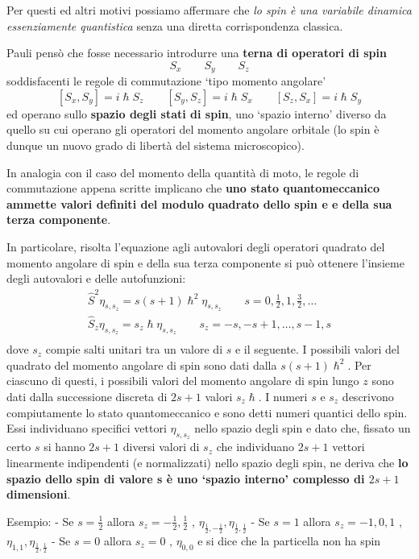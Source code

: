 Per questi ed altri motivi possiamo affermare che \emph{lo spin è una
	variabile dinamica essenziamente quantistica} senza una diretta
corrispondenza classica.

Pauli pensò che fosse necessario introdurre una \textbf{terna di
	operatori di spin} \[
	S_{x} \qquad S_{y} \qquad S_{z}
\] soddisfacenti le regole di commutazione `tipo momento angolare' \[
	[ S_{x},S_{y}] = i \hslash S_{z} \qquad  [ S_{y},S_{z}] = i \hslash S_{x} \qquad   [ S_{z},S_{x}] = i \hslash S_{y}
\] ed operano sullo \textbf{spazio degli stati di spin}, uno `spazio
interno' diverso da quello su cui operano gli operatori del momento
angolare orbitale (lo spin è dunque un nuovo grado di libertà del
sistema microscopico).

In analogia con il caso del momento della quantità di moto, le regole di
commutazione appena scritte implicano che \textbf{uno stato
	quantomeccanico ammette valori definiti del modulo quadrato dello spin e
	e della sua terza componente}.

In particolare, risolta l'equazione agli autovalori degli operatori
quadrato del momento angolare di spin e della sua terza componente si
può ottenere l'insieme degli autovalori e delle autofunzioni: \begin{gather*}
	\hat{S}^{2} \eta_{s,s_{z}} = s (s+1) \hslash^{2} \eta_{s,s_{z}} \qquad s = 0, \frac{1}{2}, 1, \frac{3}{2}, \dots\\
	\hat{S}_{z} \eta_{s,s_{z}} = s_{z} \hslash \eta_{s,s_{z}} \qquad s_{z} = -s, -s+1, \dots , s-1, s\\
\end{gather*} dove \(s_{z}\) compie salti unitari tra un valore di \(s\) e il
seguente.
I possibili valori del quadrato del momento angolare di spin
sono dati dalla \(s(s+1)\hslash^{2}\).
Per ciascuno di questi, i
possibili valori del momento angolare di spin lungo \(z\) sono dati
dalla successione discreta di \(2s+1\) valori \(s_{z} \hslash\).
I
numeri \(s\) e \(s_{z}\) descrivono compiutamente lo stato
quantomeccanico e sono detti numeri quantici dello spin.
Essi
individuano specifici vettori \(\eta_{s,s_{z}}\) nello spazio degli spin
e dato che, fissato un certo \(s\) si hanno \(2s+1\) diversi valori di
\(s_{z}\) che individuano \(2s+1\) vettori linearmente indipendenti (e
normalizzati) nello spazio degli spin, ne deriva che \textbf{lo spazio
	dello spin di valore s è uno `spazio interno' complesso di \(2s+1\)
	dimensioni}.

Esempio: - Se \(s = \frac{1}{2}\) allora
\(s_{z} = - \frac{1}{2} , \frac{1}{2}\) ,
\(\eta_{\frac{1}{2},- \frac{1}{2}}, \eta_{\frac{1}{2}, \frac{1}{2}}\) -
Se \(s = 1\) allora \(s_{z} = -1,0,1\) ,
\(\eta_{1,1},\eta_{\frac{1}{2}, \frac{1}{2}}\) - Se \(s = 0\) allora
\(s_{z} = 0\) , \(\eta_{0,0}\) e si dice che la particella non ha spin

